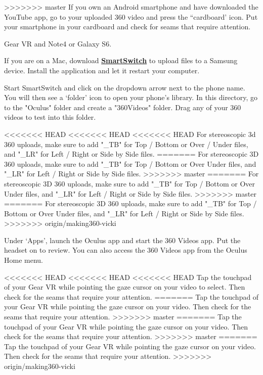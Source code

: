 \begin{fullwidth}
>>>>>>> master
If you own an Android smartphone and have downloaded the YouTube app, go to your uploaded 360 video and press the “cardboard’ icon. Put your smartphone in your cardboard and check for seams that require attention.

{\large Gear VR and Note4 or Galaxy S6. \par}

If you are on a Mac, download \textbf{\href{https://www.dropbox.com/sh/8kqte3wtyt3vltu/AAAjUnNxtXhaxprWF8_q9zbCa?dl=0}{SmartSwitch}} to upload files to a Samsung device. Install the application and let it restart your computer.

Start SmartSwitch and click on the dropdown arrow next to the phone name. You will then see a ‘folder’ icon to open your phone's library. In this directory, go to the "Oculus" folder and create a "360Videos" folder. Drag any of your 360 videos to test into this folder.

<<<<<<< HEAD
<<<<<<< HEAD
<<<<<<< HEAD
\tip For stereoscopic 3d 360 uploads, make sure to add "\_TB"  for Top / Bottom or Over / Under files, and "\_LR" for  Left / Right or Side by Side files.
=======
\tip For stereoscopic 3D 360 uploads, make sure to add "\_TB" for Top / Bottom or Over Under files, and "\_LR" for Left / Right or Side by Side files.
>>>>>>> master
=======
\tip For stereoscopic 3D 360 uploads, make sure to add "\_TB" for Top / Bottom or Over Under files, and "\_LR" for Left / Right or Side by Side files.
>>>>>>> master
=======
\tip For stereoscopic 3D 360 uploads, make sure to add "\_TB" for Top / Bottom or Over Under files, and "\_LR" for Left / Right or Side by Side files.
>>>>>>> origin/making360-vicki


\clearpage

Under ‘Apps’, launch the Oculus app and start the 360 Videos app. Put the headset on to review. You can also access the 360 Videos app from the Oculus Home menu.


<<<<<<< HEAD
<<<<<<< HEAD
<<<<<<< HEAD
Tap the touchpad of your Gear VR while pointing the gaze cursor on your video to select. Then check for the seams that require your attention.
=======
Tap the touchpad of your Gear VR while pointing the gaze cursor on your video. Then check for the seams that require your attention.
>>>>>>> master
=======
Tap the touchpad of your Gear VR while pointing the gaze cursor on your video. Then check for the seams that require your attention.
>>>>>>> master
=======
Tap the touchpad of your Gear VR while pointing the gaze cursor on your video. Then check for the seams that require your attention.
>>>>>>> origin/making360-vicki

\clearpage
\end{fullwidth}